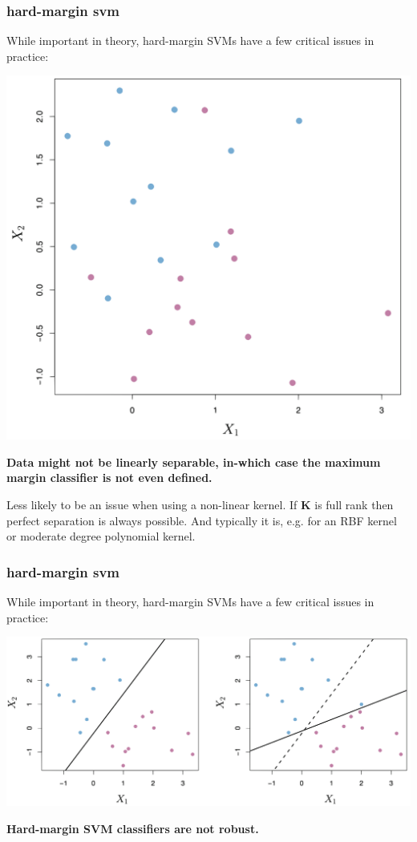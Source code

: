 \documentclass[handout,compress]{beamer}
\newcommand{\bv}[1]{\mathbf{#1}}
\begin{document}
\begin{frame}
	\frametitle{hard-margin svm}
	\small
	While important in theory, hard-margin SVMs have a few critical issues in practice:
	\begin{center}
		\vspace{-1em}
		\includegraphics[width = .4\textwidth]{nonseperable.png}
	
	\vspace{-1em}
	\textbf{Data might not be linearly separable, in-which case the maximum margin classifier is not even defined.}
	\end{center}
	Less likely to be an issue when using a non-linear kernel. If $\bv{K}$ is full rank then perfect separation is always possible. And typically it is, e.g. for an RBF kernel or moderate degree polynomial kernel. 
\end{frame}


\begin{frame}
	\frametitle{hard-margin svm}
	\small
	While important in theory, hard-margin SVMs have a few critical issues in practice:
	\begin{center}
		\vspace{-1em}
		\includegraphics[width =\textwidth]{notrobust.png}
		
		\vspace{-.5em}
		\textbf{Hard-margin SVM classifiers are not robust.}
	\end{center}
\end{frame}
\end{document}
